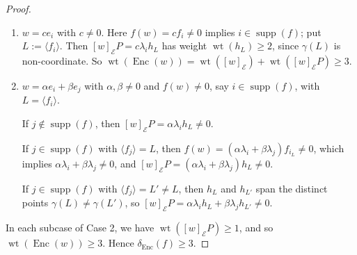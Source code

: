 \documentclass[10pt,a4paper]{amsart}
\newcommand{\Enc}{\operatorname{Enc}}
\newcommand{\wt}{\operatorname{wt}}
\begin{document}
\begin{proof}
\begin{enumerate}[wide=0pt, leftmargin=*, label=Case~\arabic*:]

\item $w=ce_i$ with $c\neq0$. Here $f(w)=cf_i\neq0$ implies
$i\in\operatorname{supp}(f)$; put $L:=\langle f_i\rangle$. Then
$[w]_{\mathcal E}P=c\lambda_ih_L$ has weight $\wt(h_L)\geq2$, since
$\gamma(L)$ is non-coordinate. So
$\wt(\Enc(w))=\wt([w]_{\mathcal E})+\wt([w]_{\mathcal E}P)\geq3$.

\item  $w=\alpha e_i+\beta e_j$ with $\alpha,\beta\neq0$ and
$f(w)\neq0$, say $i\in\operatorname{supp}(f)$, with
$L=\langle f_i\rangle$. 

If $j\notin\operatorname{supp}(f)$, then
$[w]_{\mathcal E}P=\alpha\lambda_ih_L\neq0$.

If
$j\in\operatorname{supp}(f)$ with $\langle f_j\rangle=L$, then
$f(w)=(\alpha\lambda_i+\beta\lambda_j)f_{i_L}\neq0$, which implies
$\alpha\lambda_i+\beta\lambda_j\neq0$, and
$[w]_{\mathcal E}P=(\alpha\lambda_i+\beta\lambda_j)h_L\neq0$. 

If
$j\in\operatorname{supp}(f)$ with
$\langle f_j\rangle=L'\neq L$, then $h_L$ and $h_{L'}$ span the
distinct points $\gamma(L)\neq\gamma(L')$, so
$[w]_{\mathcal E}P=\alpha\lambda_ih_L+\beta\lambda_j h_{L'}\neq0$.
\end{enumerate} 
In each subcase of Case 2, we have $\wt([w]_{\mathcal E}P) \ge 1$, and so $\wt(\Enc(w)) \ge 3$. Hence $\delta_{\Enc}(f)\geq3$.
\end{proof}
\end{document}
